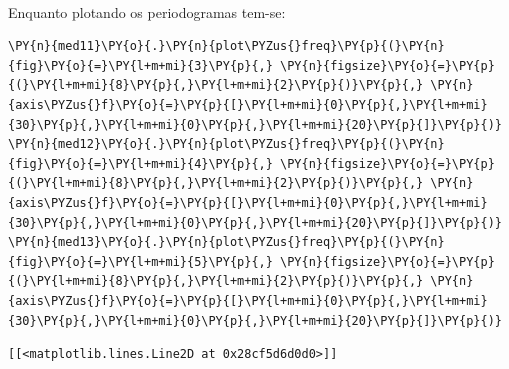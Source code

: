     \begin{center}
    \end{center}
    { \hspace*{\fill} \\}
    
    Enquanto plotando os periodogramas tem-se:

    \begin{tcolorbox}[breakable, size=fbox, boxrule=1pt, pad at break*=1mm,colback=cellbackground, colframe=cellborder]
\begin{Verbatim}[commandchars=\\\{\}]
\PY{n}{med11}\PY{o}{.}\PY{n}{plot\PYZus{}freq}\PY{p}{(}\PY{n}{fig}\PY{o}{=}\PY{l+m+mi}{3}\PY{p}{,} \PY{n}{figsize}\PY{o}{=}\PY{p}{(}\PY{l+m+mi}{8}\PY{p}{,}\PY{l+m+mi}{2}\PY{p}{)}\PY{p}{,} \PY{n}{axis\PYZus{}f}\PY{o}{=}\PY{p}{[}\PY{l+m+mi}{0}\PY{p}{,}\PY{l+m+mi}{30}\PY{p}{,}\PY{l+m+mi}{0}\PY{p}{,}\PY{l+m+mi}{20}\PY{p}{]}\PY{p}{)}
\PY{n}{med12}\PY{o}{.}\PY{n}{plot\PYZus{}freq}\PY{p}{(}\PY{n}{fig}\PY{o}{=}\PY{l+m+mi}{4}\PY{p}{,} \PY{n}{figsize}\PY{o}{=}\PY{p}{(}\PY{l+m+mi}{8}\PY{p}{,}\PY{l+m+mi}{2}\PY{p}{)}\PY{p}{,} \PY{n}{axis\PYZus{}f}\PY{o}{=}\PY{p}{[}\PY{l+m+mi}{0}\PY{p}{,}\PY{l+m+mi}{30}\PY{p}{,}\PY{l+m+mi}{0}\PY{p}{,}\PY{l+m+mi}{20}\PY{p}{]}\PY{p}{)}
\PY{n}{med13}\PY{o}{.}\PY{n}{plot\PYZus{}freq}\PY{p}{(}\PY{n}{fig}\PY{o}{=}\PY{l+m+mi}{5}\PY{p}{,} \PY{n}{figsize}\PY{o}{=}\PY{p}{(}\PY{l+m+mi}{8}\PY{p}{,}\PY{l+m+mi}{2}\PY{p}{)}\PY{p}{,} \PY{n}{axis\PYZus{}f}\PY{o}{=}\PY{p}{[}\PY{l+m+mi}{0}\PY{p}{,}\PY{l+m+mi}{30}\PY{p}{,}\PY{l+m+mi}{0}\PY{p}{,}\PY{l+m+mi}{20}\PY{p}{]}\PY{p}{)}
\end{Verbatim}
\end{tcolorbox}

            \begin{tcolorbox}[breakable, size=fbox, boxrule=.5pt, pad at break*=1mm, opacityfill=0]
\begin{Verbatim}[commandchars=\\\{\}]
[[<matplotlib.lines.Line2D at 0x28cf5d6d0d0>]]
\end{Verbatim}
\end{tcolorbox}
        
    \begin{center}
    \end{center}
    { \hspace*{\fill} \\}
    
